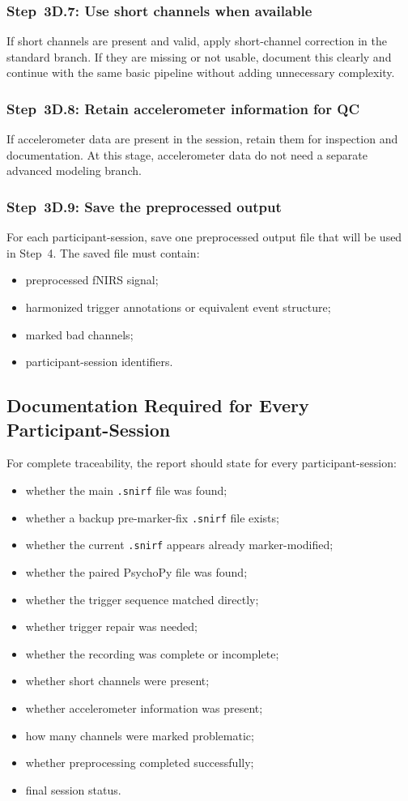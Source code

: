 \subsubsection{Step~3D.7: Use short channels when available}
If short channels are present and valid, apply short-channel correction in the standard branch.
If they are missing or not usable, document this clearly and continue with the same basic pipeline
without adding unnecessary complexity.

\subsubsection{Step~3D.8: Retain accelerometer information for QC}
If accelerometer data are present in the session, retain them for inspection and documentation.
At this stage, accelerometer data do not need a separate advanced modeling branch.

\subsubsection{Step~3D.9: Save the preprocessed output}
For each participant-session, save one preprocessed output file that will be used in Step~4.
The saved file must contain:
\begin{itemize}
    \item preprocessed fNIRS signal;
    \item harmonized trigger annotations or equivalent event structure;
    \item marked bad channels;
    \item participant-session identifiers.
\end{itemize}

\subsection{Documentation Required for Every Participant-Session}
For complete traceability, the report should state for every participant-session:
\begin{itemize}
    \item whether the main \texttt{.snirf} file was found;
    \item whether a backup pre-marker-fix \texttt{.snirf} file exists;
    \item whether the current \texttt{.snirf} appears already marker-modified;
    \item whether the paired PsychoPy file was found;
    \item whether the trigger sequence matched directly;
    \item whether trigger repair was needed;
    \item whether the recording was complete or incomplete;
    \item whether short channels were present;
    \item whether accelerometer information was present;
    \item how many channels were marked problematic;
    \item whether preprocessing completed successfully;
    \item final session status.
\end{itemize}

